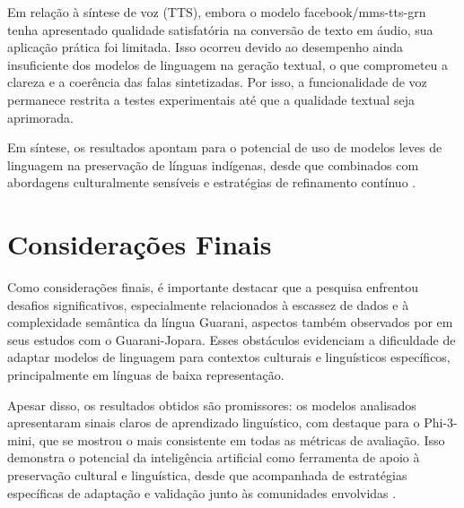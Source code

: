 \documentclass[10pt,conference]{IEEEtran}
\begin{document}
Em relação à síntese de voz (TTS), embora o modelo facebook/mms-tts-grn tenha apresentado qualidade satisfatória na conversão de texto em áudio, sua aplicação prática foi limitada. Isso ocorreu devido ao desempenho ainda insuficiente dos modelos de linguagem na geração textual, o que comprometeu a clareza e a coerência das falas sintetizadas. Por isso, a funcionalidade de voz permanece restrita a testes experimentais até que a qualidade textual seja aprimorada.

Em síntese, os resultados apontam para o potencial de uso de modelos leves de linguagem na preservação de línguas indígenas, desde que combinados com abordagens culturalmente sensíveis e estratégias de refinamento contínuo \cite{nagoudi2021indt5}.

\section{Considerações Finais}
Como considerações finais, é importante destacar que a pesquisa enfrentou desafios significativos, especialmente relacionados à escassez de dados e à complexidade semântica da língua Guarani, aspectos também observados por \cite{diaz2025building} em seus estudos com o Guarani-Jopara. Esses obstáculos evidenciam a dificuldade de adaptar modelos de linguagem para contextos culturais e linguísticos específicos, principalmente em línguas de baixa representação.

Apesar disso, os resultados obtidos são promissores: os modelos analisados apresentaram sinais claros de aprendizado linguístico, com destaque para o Phi-3-mini, que se mostrou o mais consistente em todas as métricas de avaliação. Isso demonstra o potencial da inteligência artificial como ferramenta de apoio à preservação cultural e linguística, desde que acompanhada de estratégias específicas de adaptação e validação junto às comunidades envolvidas \cite{deferia2024uso, cabral2016guarani}.



\end{document}
